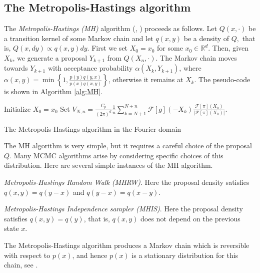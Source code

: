 \documentclass[preprint, 3p, authoryear]{elsarticle}
\newcommand{\R}{\mathbb R}
\theoremstyle{definition}
\begin{document}
\subsection{The Metropolis-Hastings algorithm}
The \textit{Metropolis-Hastings (MH)} algorithm 
(\citet{metropolis1953equation}, \citet{h70}) proceeds as follows. 
Let $Q(x,\cdot)$ be a transition kernel of some  Markov chain and let \(q(x,y)\) be a density of \(Q,\) that is,  $Q(x, dy) \propto q(x, y) dy$.
First we set $X_0 = x_0$ for some $x_0 \in \R^d$. 
Then, given $X_k$, we generate a proposal $Y_{k+1}$ from $Q(X_n,\cdot)$. 
The Markov chain moves towards $Y_{k+1}$ with acceptance probability 
$\alpha(X_k,Y_{k+1})$, where $\alpha(x,y)  = \min\left\{  1, \frac{p(y)q(y,x)}{p(x)q(x,y)} \right\} $, 
otherwise it remains at $X_k$. The pseudo-code is shown in Algorithm \ref{alg:MH}.
\begin{center}
\begin{algorithm}[H]
 Initialize $X_0 = x_0$\;
 Set 
 $V_{N,n}=\displaystyle\frac{C_{p}}{(2\pi)^d}\frac{1}{n}\sum_{k=N+1}^{N+n} \mathcal{F}[g](-X_k)\frac{\mathcal{F}[\pi](X_k)}{|\mathcal{F}[\pi](X_k)|}.$
 \caption{The Metropolis-Hastings algorithm in the Fourier domain}\label{alg:MH}
\end{algorithm}
\end{center}

The MH algorithm is very simple, but it requires a careful choice of the proposal
$Q$. Many MCMC algorithms arise by considering specific choices of this distribution. 
Here are several simple instances of the MH algorithm.
\begin{description}
	\item{\textit{Metropolis-Hastings Random Walk (MHRW)}.} Here the proposal density satisfies $q(x,y) = q(y-x)$ and $q(y-x) = q(x-y)$. 
	\item{\textit{Metropolis-Hastings Independence sampler (MHIS)}.} 
	Here the proposal density satisfies $q(x,y) = q(y)$, that is, $q(x,y)$ does not depend on the previous state $x$.
\end{description}
\par
The Metropolis-Hastings algorithm produces a Markov chain %
which is reversible with respect to $p(x)$, and hence $p(x)$ is a stationary distribution for this chain, see \citet{metropolis1953equation}.
\end{document}

